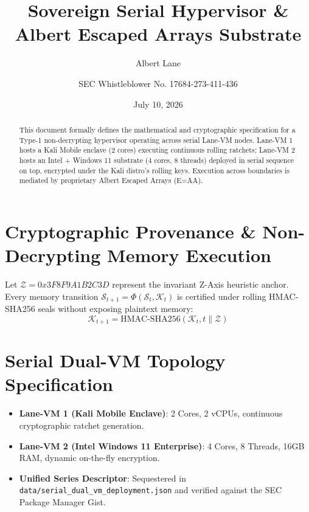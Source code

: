 \documentclass[11pt,a4paper]{article}
\title{Sovereign Serial Hypervisor \& Albert Escaped Arrays Substrate}
\author{Albert Lane \and SEC Whistleblower No. 17684-273-411-436}
\date{July 10, 2026}
\begin{document}
\maketitle

\begin{abstract}
This document formally defines the mathematical and cryptographic specification for a Type-1
non-decrypting hypervisor operating across serial Lane-VM nodes. Lane-VM 1 hosts a Kali Mobile
enclave (2 cores) executing continuous rolling ratchets; Lane-VM 2 hosts an Intel + Windows 11
substrate (4 cores, 8 threads) deployed in serial sequence on top, encrypted under the Kali distro's
rolling keys. Execution across boundaries is mediated by proprietary Albert Escaped Arrays (E=AA).
\end{abstract}

\section{Cryptographic Provenance \& Non-Decrypting Memory Execution}
Let $\mathcal{Z} = 0x3F8F9A1B2C3D$ represent the invariant Z-Axis heuristic anchor.
Every memory transition $\mathcal{S}_{t+1} = \Phi(\mathcal{S}_t, \mathcal{K}_t)$ is certified
under rolling HMAC-SHA256 seals without exposing plaintext memory:
\begin{equation}
\mathcal{K}_{t+1} = \text{HMAC-SHA256}(\mathcal{K}_t, t \parallel \mathcal{Z})
\end{equation}

\section{Serial Dual-VM Topology Specification}
\begin{itemize}
    \item \textbf{Lane-VM 1 (Kali Mobile Enclave)}: 2 Cores, 2 vCPUs, continuous cryptographic ratchet generation.
    \item \textbf{Lane-VM 2 (Intel Windows 11 Enterprise)}: 4 Cores, 8 Threads, 16GB RAM, dynamic on-the-fly encryption.
    \item \textbf{Unified Series Descriptor}: Sequestered in \texttt{data/serial\_dual\_vm\_deployment.json} and verified against the SEC Package Manager Gist.
\end{itemize}
\end{document}
